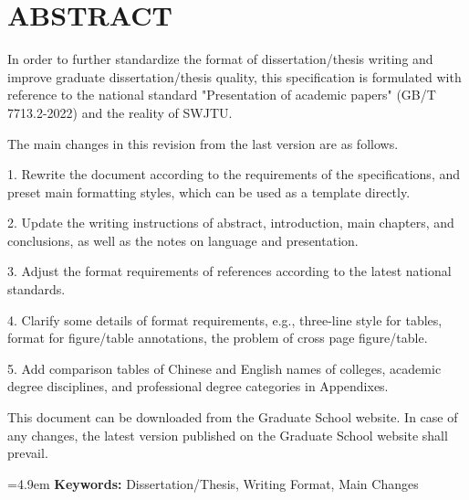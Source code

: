 \chapter*{\textbf{ABSTRACT}}
\eabstractpagestyle %

In order to further standardize the format of dissertation/thesis writing and improve graduate dissertation/thesis quality, this specification is formulated with reference to the national standard "Presentation of academic papers" (GB/T 7713.2-2022) and the reality of SWJTU.

The main changes in this revision from the last version are as follows.

1. Rewrite the document according to the requirements of the specifications, and preset main formatting styles, which can be used as a template directly.

2. Update the writing instructions of abstract, introduction, main chapters, and conclusions, as well as the notes on language and presentation.

3. Adjust the format requirements of references according to the latest national standards.

4. Clarify some details of format requirements, e.g., three-line style for tables, format for figure/table annotations, the problem of cross page figure/table.

5. Add comparison tables of Chinese and English names of colleges, academic degree disciplines, and professional degree categories in Appendixes.

This document can be downloaded from the Graduate School website. In case of any changes, the latest version published on the Graduate School website shall prevail.

\vspace{1em}

\noindent \hangindent=4.9em \textbf{Keywords: }Dissertation/Thesis, Writing Format, Main Changes